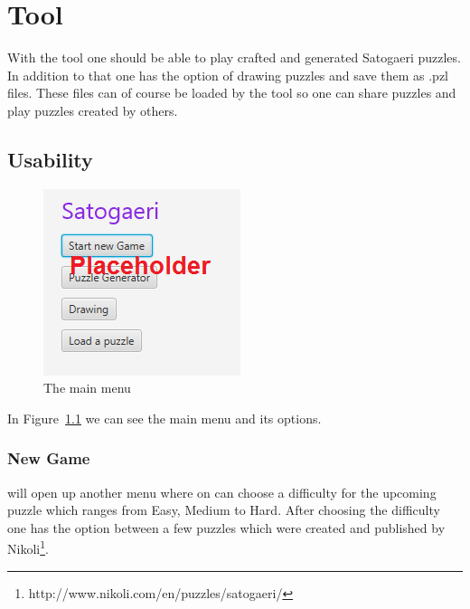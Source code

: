 \chapter{Tool} \label{The Tool}
With the tool one should be able to play crafted and generated Satogaeri puzzles. In addition to that one has the option of drawing puzzles and save them as .pzl files. These files can of course be loaded by the tool so one can share puzzles and play puzzles created by others.

\section{Usability}
\begin{figure}
  \centering
  \includegraphics[scale=1]{Pictures/main_menu.png} 
  \caption{The main menu}
  \label{fig:main_menu}
\end{figure}
In Figure~\ref{fig:main_menu} we can see the main menu and its options.

\subsection{New Game} will open up another menu where on can choose a difficulty for the upcoming puzzle which ranges from Easy, Medium to Hard. After choosing the difficulty one has the option between a few puzzles which were created and published by Nikoli\footnote{http://www.nikoli.com/en/puzzles/satogaeri/}.

